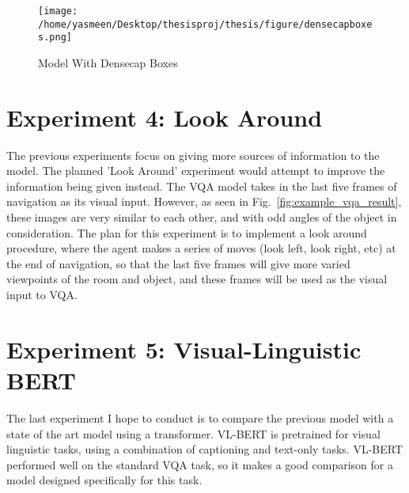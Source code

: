 \begin{figure}[h]
     \centering
     \texttt{[image: /home/yasmeen/Desktop/thesisproj/thesis/figure/densecapboxes.png]}
     \caption{Model With Densecap Boxes}
     \label{fig:densecap_boxes}
\end{figure}

\section{Experiment 4: Look Around}
The previous experiments focus on giving more sources of information to the model. The planned 'Look Around' experiment would attempt to improve the information being given instead. The VQA model takes in the last five frames of navigation as its visual input. However, as seen in Fig.~\ref{fig:example_vqa_result}, these images are very similar to each other, and with odd angles of the object in consideration. The plan for this experiment is to implement a look around procedure, where the agent makes a series of moves (look left, look right, etc) at the end of navigation, so that the last five frames will give more varied viewpoints of the room and object, and these frames will be used as the visual input to VQA. 

\section{Experiment 5: Visual-Linguistic BERT}
The last experiment I hope to conduct is to compare the previous model with a state of the art model using a transformer. VL-BERT is pretrained for visual linguistic tasks, using a combination of captioning and text-only tasks\cite{VLBERT}. VL-BERT performed well on the standard VQA task, so it makes a good comparison for a model designed specifically for this task. 
